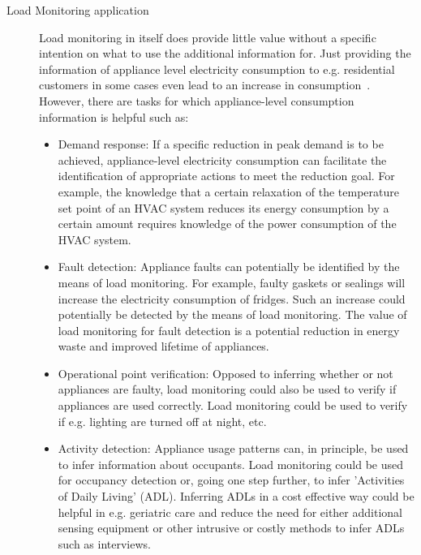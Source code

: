 \documentclass[11pt]{cmuthesis} %
\begin{document}
\begin{description}
\item[Load Monitoring application] Load monitoring in itself does provide little value without a specific intention on what to use the additional information for. Just providing the information of appliance level electricity consumption to e.g. residential customers in some cases even lead to an increase in consumption~\cite{kelly2016does}. However, there are tasks for which appliance-level consumption information is helpful such as:
\begin{itemize}
    \item Demand response: If a specific reduction in peak demand is to be achieved, appliance-level electricity consumption can facilitate the identification of appropriate actions to meet the reduction goal. For example, the knowledge that a certain relaxation of the temperature set point of an HVAC system reduces its energy consumption by a certain amount requires knowledge of the power consumption of the HVAC system.~\cite{he2013incorporating}
    \item Fault detection: Appliance faults can potentially be identified by the means of load monitoring. For example, faulty gaskets or sealings will increase the electricity consumption of fridges. Such an increase could potentially be detected by the means of load monitoring. The value of load monitoring for fault detection is a potential reduction in energy waste and improved lifetime of appliances.
    \item Operational point verification: Opposed to inferring whether or not appliances are faulty, load monitoring could also be used to verify if appliances are used correctly. Load monitoring could be used to verify if e.g. lighting are turned off at night, etc.
    \item Activity detection: Appliance usage patterns can, in principle, be used to infer information about occupants. Load monitoring could be used for occupancy detection or, going one step further, to infer 'Activities of Daily Living' (ADL). Inferring ADLs in a cost effective way could be helpful in e.g. geriatric care and reduce the need for either additional sensing equipment or other intrusive or costly methods to infer ADLs such as interviews.~\cite{alcala2015detecting}
\end{itemize}

\end{description}
\end{document}
